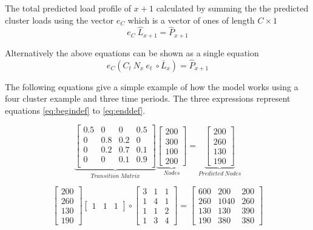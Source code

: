 The total predicted load profile of $x+1$ calculated by summing the the predicted cluster loads using the vector $e_C$ which is a vector of ones of length $C \times 1$
\begin{equation}
e_C \:\hat{L}_{x+1}= \hat{P}_{x+1}
\end{equation}

Alternatively the above equations can be shown as a single equation 
\begin{equation}
e_C(C_t \:N_x \: e_t \: \circ \bar{L}_x) = \hat{P}_{x+1}
\label{eq:enddef}
\end{equation}



The following equations give a simple example of how the model works using a four cluster example and three time periods. The three expressions represent equations \ref{eq:begindef} to \ref{eq:enddef}.

\begin{equation}
\underbrace{\begin{bmatrix}
0.5 & 0   & 0   & 0.5 \\
 0   & 0.8 & 0.2 & 0   \\
 0   & 0.2 & 0.7 & 0.1   \\
 0   & 0   & 0.1   & 0.9  \\
\end{bmatrix}
}_{Transition \; Matrix}
\underbrace{\begin{bmatrix}
200 \\ 300 \\ 100 \\ 200 
\end{bmatrix}
}_{Nodes}
=
\underbrace{\begin{bmatrix}
200 \\ 260 \\ 130 \\ 190 
\end{bmatrix}
}_{Predicted \:Nodes}
\label{eq:begineaxmple}
\end{equation}

\begin{equation}
\begin{bmatrix}
200 \\ 260 \\ 130 \\ 190 
\end{bmatrix}
\begin{bmatrix}
1 & 1  & 1 
\end{bmatrix}
\circ
\begin{bmatrix}
3 & 1 &1 \\ 
1 &4  & 1\\ 
1 & 1 &2 \\ 
 1& 3 & 4
\end{bmatrix} =
\begin{bmatrix}
600 & 200 &200 \\ 
260 &1040  & 260\\ 
130 & 130 &390 \\ 
 190& 380 & 380
\end{bmatrix}
\end{equation}

